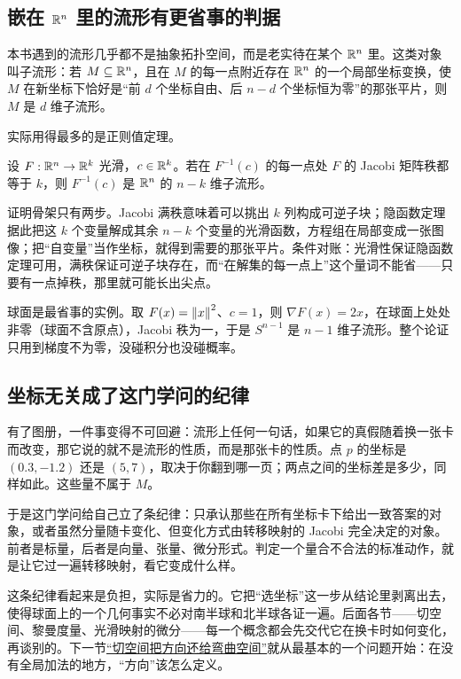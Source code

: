 \subsection{嵌在 \(\mathbb{R}^{n}\) 里的流形有更省事的判据}

本书遇到的流形几乎都不是抽象拓扑空间，而是老实待在某个 \(\mathbb{R}^{n}\) 里。这类对象叫子流形：若 \(M\subseteq\mathbb{R}^{n}\)，且在 \(M\) 的每一点附近存在 \(\mathbb{R}^{n}\) 的一个局部坐标变换，使 \(M\) 在新坐标下恰好是``前 \(d\) 个坐标自由、后 \(n-d\) 个坐标恒为零''的那张平片，则 \(M\) 是 \(d\) 维子流形。

实际用得最多的是正则值定理。

\begin{theorem}[正则值定理]
设 \(F:\mathbb{R}^{n}\to\mathbb{R}^{k}\) 光滑，\(c\in\mathbb{R}^{k}\)。若在 \(F^{-1}(c)\) 的每一点处 \(F\) 的 Jacobi 矩阵秩都等于 \(k\)，则 \(F^{-1}(c)\) 是 \(\mathbb{R}^{n}\) 的 \(n-k\) 维子流形。
\end{theorem}

证明骨架只有两步。Jacobi 满秩意味着可以挑出 \(k\) 列构成可逆子块；隐函数定理据此把这 \(k\) 个变量解成其余 \(n-k\) 个变量的光滑函数，方程组在局部变成一张图像；把``自变量''当作坐标，就得到需要的那张平片。条件对账：光滑性保证隐函数定理可用，满秩保证可逆子块存在，而``在解集的每一点上''这个量词不能省——只要有一点掉秩，那里就可能长出尖点。

球面是最省事的实例。取 \(F(x)=\left\lVert x\right\rVert^{2}\)、\(c=1\)，则 \(\nabla F(x)=2x\)，在球面上处处非零（球面不含原点），Jacobi 秩为一，于是 \(S^{n-1}\) 是 \(n-1\) 维子流形。整个论证只用到梯度不为零，没碰积分也没碰概率。

\subsection{坐标无关成了这门学问的纪律}

有了图册，一件事变得不可回避：流形上任何一句话，如果它的真假随着换一张卡而改变，那它说的就不是流形的性质，而是那张卡的性质。点 \(p\) 的坐标是 \((0.3,-1.2)\) 还是 \((5,7)\)，取决于你翻到哪一页；两点之间的坐标差是多少，同样如此。这些量不属于 \(M\)。

于是这门学问给自己立了条纪律：只承认那些在所有坐标卡下给出一致答案的对象，或者虽然分量随卡变化、但变化方式由转移映射的 Jacobi 完全决定的对象。前者是标量，后者是向量、张量、微分形式。判定一个量合不合法的标准动作，就是让它过一遍转移映射，看它变成什么样。

这条纪律看起来是负担，实际是省力的。它把``选坐标''这一步从结论里剥离出去，使得球面上的一个几何事实不必对南半球和北半球各证一遍。后面各节——切空间、黎曼度量、光滑映射的微分——每一个概念都会先交代它在换卡时如何变化，再谈别的。下一节\hyperref[sec:12-Real-Analysis-Support/08-Manifold-Basics/02]{``切空间把方向还给弯曲空间''}就从最基本的一个问题开始：在没有全局加法的地方，``方向''该怎么定义。
